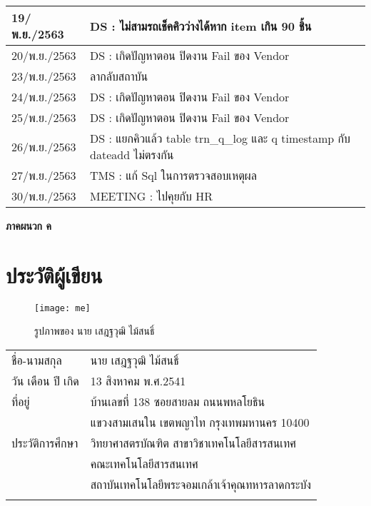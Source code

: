 \begin{longtable}{|l|l|}
	\hline
	19/พ.ย./2563    & DS : ไม่สามรถเช็คคิวว่างได้หาก item เกิน 90 ชิ้น                                \\ 
	\hline
	20/พ.ย./2563    & DS : เกิดปัญหาตอน ปิดงาน Fail ของ Vendor                                        \\ 
	\hline
	23/พ.ย./2563    & ลากลับสถาบัน                                                                    \\ 
	\hline
	24/พ.ย./2563    & DS : เกิดปัญหาตอน ปิดงาน Fail ของ Vendor                                        \\ 
	\hline
	25/พ.ย./2563    & DS : เกิดปัญหาตอน ปิดงาน Fail ของ Vendor                                        \\ 
	\hline
	26/พ.ย./2563    & DS : แยกคิวแล้ว table trn\_q\_log และ q timestamp กับ dateadd ไม่ตรงกัน         \\ 
	\hline
	27/พ.ย./2563    & TMS : แก้ Sql ในการตรวจสอบเหตุผล                                                \\ 
	\hline
	30/พ.ย./2563    & MEETING : ไปคุยกับ HR                                                           \\
	\hline
\end{longtable}
	
	

\clearpage 
\thispagestyle{empty}
\begin{center}
	\LARGE{\textbf{ภาคผนวก ค}}
\end{center}

\chapter{ประวัติผู้เขียน}
\begin{figure}[H]
	\centering
	\texttt{[image: me]}
	\caption{รูปภาพของ นาย เสฎฐวุฒิ ไม้สนธิ์}
	\label{Fig:999}
\end{figure}
\begin{tabularx}{\linewidth}{lX}
	ชื่อ-นามสกุล&นาย เสฎฐวุฒิ ไม้สนธิ์\\
	วัน เดือน ปี เกิด&13 สิงหาคม พ.ศ.2541\\
	ที่อยู่& บ้านเลขที่ 138 ซอยสายลม ถนนพหลโยธิน 
	\\
	&แขวงสามเสนใน เขตพญาไท กรุงเทพมหานคร 10400
	\\
	ประวัติการศึกษา&วิทยาศาสตรบัณฑิต สาขาวิชาเทคโนโลยีสารสนเทศ
	\\
	&คณะเทคโนโลยีสารสนเทศ
	\\
	&สถาบันเทคโนโลยีพระจอมเกล้าเจ้าคุณทหารลาดกระบัง
	\\
	\\
\end{tabularx}